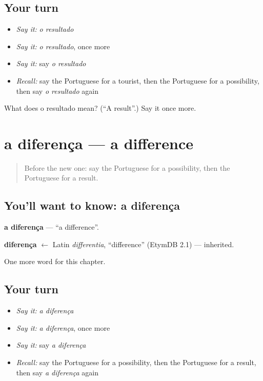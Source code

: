 \subsection*{Your turn}
\begin{itemize}
\raggedright
  \item \emph{Say it:} \emph{o resultado}
  \item \emph{Say it:} \emph{o resultado}, once more
  \item \emph{Say it:} say \emph{o resultado}
  \item \emph{Recall:} say the Portuguese for a tourist, then the Portuguese for a possibility, then say \emph{o resultado} again
\end{itemize}

\begin{tcolorbox}[breakable,colback=teal!4,colframe=teal!35!black,title={Before you move on}]
What does o resultado mean? (\textquotedblleft{}A result\textquotedblright{}.) Say it once more.
\end{tcolorbox}
\section[a diferença]{a diferença — a difference}

\label{lesson:PT-C161-diferenca}



\begin{quote}
Before the new one: say the Portuguese for a possibility, then the Portuguese for a result.
\end{quote}

\subsection*{You'll want to know: a diferença}
\textbf{a diferença} — \textquotedblleft{}a difference\textquotedblright{}.

\begin{cousinweb}
\textbf{diferença} $\leftarrow$ Latin \emph{differentia}, \textquotedblleft{}difference\textquotedblright{} (EtymDB 2.1) — inherited.
\end{cousinweb}

\begin{grammarlens}[title={What you've built}]
One more word for this chapter.
\end{grammarlens}

\subsection*{Your turn}
\begin{itemize}
\raggedright
  \item \emph{Say it:} \emph{a diferença}
  \item \emph{Say it:} \emph{a diferença}, once more
  \item \emph{Say it:} say \emph{a diferença}
  \item \emph{Recall:} say the Portuguese for a possibility, then the Portuguese for a result, then say \emph{a diferença} again
\end{itemize}

